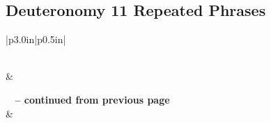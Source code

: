\subsection{Deuteronomy 11 Repeated Phrases}


\normalsize
 
\begin{center}
\begin{longtable}{|p{3.0in}|p{0.5in}|}
\caption[Deuteronomy 11 Repeated Phrases]{Deuteronomy 11 Repeated Phrases}\label{table:Repeated Phrases Deuteronomy 11} \\
\hline {} &  \\ \hline 
\endfirsthead
 
{{\bfseries \tablename\ \thetable{} -- continued from previous page}} \\  
\hline {} &  \\ \hline 
\endhead
 

\end{longtable}
\end{center}
